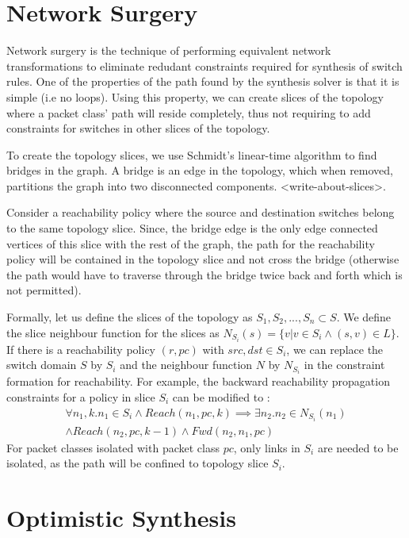 \documentclass[]{sig}
\begin{document}
\section{Network Surgery}
Network surgery is the technique of performing equivalent network transformations to eliminate redudant constraints required for synthesis of switch rules. One of the properties of the path found by the synthesis solver is that it is simple (i.e no loops). Using this property, we can create slices of the topology where a packet class' path will reside completely, thus not requiring to add constraints for switches in other slices of the topology. 

To create the topology slices, we use Schmidt's linear-time algorithm\cite{schmidt} to find bridges in the graph. A bridge is an edge in the topology, which when removed, partitions the graph into two disconnected components. <write-about-slices>. 

Consider a reachability policy where the source and destination switches belong to the same topology slice. Since, the bridge edge is the only edge connected vertices of this slice with the rest of the graph, the path for the reachability policy will be contained in the topology slice and not cross the bridge (otherwise the path would have to traverse through the bridge twice back and forth which is not permitted). 

Formally, let us define the slices of the topology as $S_1, S_2, ..., S_n \subset S$. We define the slice neighbour function for the slices as $N_{S_i}(s) = \{v | v \in S_i \wedge (s,v) \in L\}$. If there is a reachability policy $(r, pc)$ with $src,dst \in S_i$, we can replace the switch domain $S$ by $S_i$ and the neighbour function $N$ by $N_{S_i}$ in the constraint formation for reachability. For example, the backward reachability propagation constraints for a policy in slice $S_i$ can be modified to : 
\begin{multline}
\forall n_1,k.  n_1 \in S_i \wedge Reach(n_1,pc,k) \implies \exists n_2. n_2 \in N_{S_i}(n_1) \\ \wedge  Reach(n_2,pc,k-1) \wedge Fwd(n_2,n_1,pc)
\end{multline}
For packet classes isolated with packet class $pc$, only links in $S_i$ are needed to be isolated, as the path will be confined to topology slice $S_i$. 

\section{Optimistic Synthesis}
\end{document}
